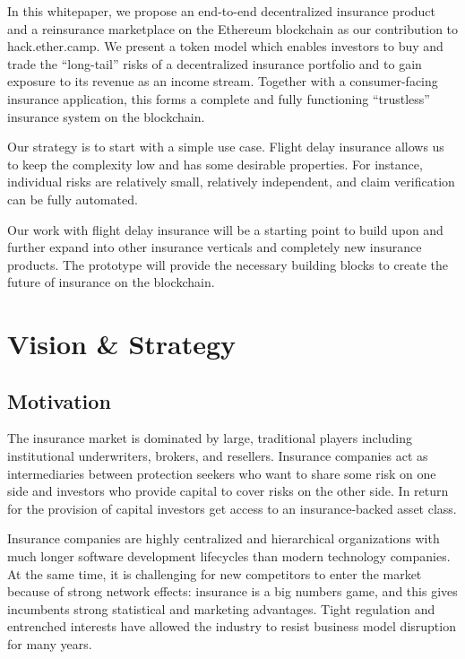 \documentclass[12pt]{article}
\begin{document}
In this whitepaper, we propose an end-to-end decentralized insurance product and a reinsurance marketplace on the Ethereum blockchain as our contribution to hack.ether.camp. We present a token model which enables investors to buy and trade the “long-tail” risks of a decentralized insurance portfolio and to gain exposure to its revenue as an income stream. Together with a consumer-facing insurance application, this forms a complete and fully functioning “trustless” insurance system on the blockchain.

Our strategy is to start with a simple use case. Flight delay insurance allows us to keep the complexity low and has some desirable properties. For instance, individual risks are relatively small, relatively independent, and claim verification can be fully automated. 

Our work with flight delay insurance will be a starting point to build upon and further expand into other insurance verticals and completely new insurance products. The prototype will provide the necessary building blocks to create the future of insurance on the blockchain.


\section{Vision \& Strategy}

\subsection{Motivation}

The insurance market is dominated by large, traditional players including institutional underwriters, brokers, and resellers. Insurance companies act as intermediaries between protection seekers who want to share some risk on one side and investors who provide capital to cover risks on the other side. In return for the provision of capital investors get access to an insurance-backed asset class.

Insurance companies are highly centralized and hierarchical organizations with much longer software development lifecycles than modern technology companies. At the same time, it is challenging for new competitors to enter the market because of strong network effects: insurance is a big numbers game, and this gives incumbents strong statistical and marketing advantages. Tight regulation and entrenched interests have allowed the industry to resist business model disruption for many years.
\end{document}
